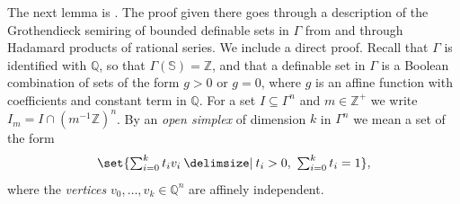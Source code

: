 \documentclass[12pt]{amsart}
\newcommand{\memph}[1]{{\color{magenta}\emph{#1}}}
\theoremstyle{plain}
\theoremstyle{definition}
\theoremstyle{remark}
\numberwithin{equation}{section}
\theoremstyle{plain}
\newcommand{\Z}{\mathds{Z}}
\newcommand{\Q}{\mathds{Q}}
\newcommand{\0}{\emptyset}
\newcommand{\sub}{\subseteq}
\providecommand\given{}
\newcommand\SetSymbol[1][]{%
\nonscript \: #1 \vert
\allowbreak
\nonscript\:
\mathopen{}}
\renewcommand\given{\SetSymbol[\delimsize]}
\begin{document}
The next lemma is \cite[Lemma~8.5.2]{hru:loe:lef}. The proof given there goes through a description of the Grothendieck semiring of bounded definable sets in $\Gamma$ from \cite[\S~2]{hru:kaz:value:ring} and through Hadamard products of rational series. We include a direct proof. Recall that $\Gamma$ is identified with $\Q$, so that $\Gamma(\mathbb{S}) = \Z$, and that a definable set in $\Gamma$ is a Boolean combination of sets of the form $g > 0$ or $g = 0$, where $g$ is an affine function with coefficients and constant term in $\Q$. For a set $I \sub \Gamma^n$ and $m \in \Z^+$ we write $I_m = I \cap (m^{-1}\Z)^n$. By an \memph{open simplex} of dimension $k$ in $\Gamma^n$ we mean a set of the form
\[
\set{ \textstyle\sum_{i=0}^k t_i v_i \given t_i > 0, \ \sum_{i=0}^k t_i = 1 },
\]
where the \memph{vertices} $v_0, \ldots, v_k \in \Q^n$ are affinely independent.
\end{document}
